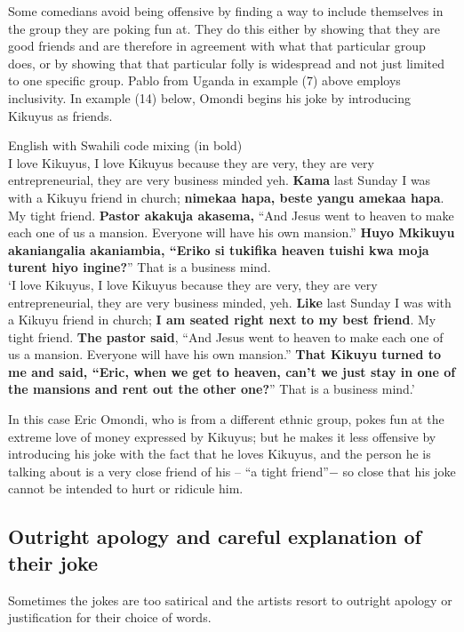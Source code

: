 \documentclass[output=paper]{langsci/langscibook}
\begin{document}
   Some comedians avoid being offensive by finding a way to include themselves in the group they are poking fun at. They do this either by showing that they are good friends and are therefore in agreement with what that particular group does, or by showing that that particular folly is widespread and not just limited to one specific group. Pablo from Uganda in example (7) above employs inclusivity. In example (14) below, Omondi begins his joke by introducing Kikuyus as friends. 

\ea
{English with Swahili code mixing (in bold)}\\
I love Kikuyus, I love Kikuyus because they are very, they are very entrepreneurial, they are very business minded yeh. \textbf{Kama} last Sunday I was with a Kikuyu friend in church; \textbf{nimekaa hapa, beste yangu amekaa hapa}. My tight friend. \textbf{Pastor akakuja akasema,} “And Jesus went to heaven to make each one of us a mansion. Everyone will have his own mansion.” \textbf{Huyo Mkikuyu akaniangalia akaniambia, “Eriko si tukifika heaven tuishi kwa moja turent hiyo ingine?}” That is a business mind. \\
\glt ‘I love Kikuyus, I love Kikuyus because they are very, they are very entrepreneurial, they are very business minded, yeh. \textbf{Like} last Sunday I was with a Kikuyu friend in church; \textbf{I am seated right next to my best friend}. My tight friend. \textbf{The pastor said}, “And Jesus went to heaven to make each one of us a mansion. Everyone will have his own mansion.” \textbf{That Kikuyu turned to me and said, “Eric, when we get to heaven, can’t we just stay in one of the mansions and rent out the other one?}” That is a business mind.’ \citep{Quarshe2015}
\z

In this case Eric Omondi, who is from a different ethnic group, pokes fun at the extreme love of money expressed by Kikuyus; but he makes it less offensive by introducing his joke with the fact that he loves Kikuyus, and the person he is talking about is a very close friend of his – “a tight friend”$-$ so close that his joke cannot be intended to hurt or ridicule him.

\subsection{Outright apology and careful explanation of their joke }

Sometimes the jokes are too satirical and the artists resort to outright apology or justification for their choice of words. 
\end{document}
